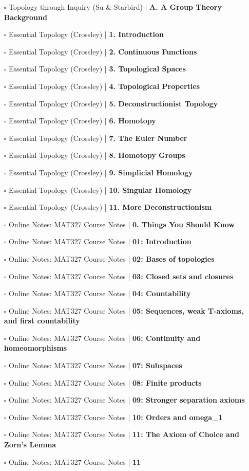 \documentclass[a4, landscape, 12pt]{article}
\newcommand{\checkbox}{$\square$}%
\begin{document}
\begin{itemize}
{}
\item [\checkbox] Topology through Inquiry (Su & Starbird)  | \textbf{A. A Group Theory Background
}
\item [\checkbox] Essential Topology (Crossley)  | \textbf{1. Introduction
}
\item [\checkbox] Essential Topology (Crossley)  | \textbf{2. Continuous Functions
}
\item [\checkbox] Essential Topology (Crossley)  | \textbf{3. Topological Spaces
}
\item [\checkbox] Essential Topology (Crossley)  | \textbf{4. Topological Properties
}
\item [\checkbox] Essential Topology (Crossley)  | \textbf{5. Deconstructionist Topology
}
\item [\checkbox] Essential Topology (Crossley)  | \textbf{6. Homotopy
}
\item [\checkbox] Essential Topology (Crossley)  | \textbf{7. The Euler Number
}
\item [\checkbox] Essential Topology (Crossley)  | \textbf{8. Homotopy Groups
}
\item [\checkbox] Essential Topology (Crossley)  | \textbf{9. Simplicial Homology
}
\item [\checkbox] Essential Topology (Crossley)  | \textbf{10. Singular Homology
}
\item [\checkbox] Essential Topology (Crossley)  | \textbf{11. More Deconstructionism
}
\item [\checkbox] Online Notes: MAT327 Course Notes  | \textbf{0. Things You Should Know
}
\item [\checkbox] Online Notes: MAT327 Course Notes  | \textbf{01: Introduction
}
\item [\checkbox] Online Notes: MAT327 Course Notes  | \textbf{02: Bases of topologies
}
\item [\checkbox] Online Notes: MAT327 Course Notes  | \textbf{03: Closed sets and closures
}
\item [\checkbox] Online Notes: MAT327 Course Notes  | \textbf{04: Countability
}
\item [\checkbox] Online Notes: MAT327 Course Notes  | \textbf{05: Sequences, weak T-axioms, and first countability
}
\item [\checkbox] Online Notes: MAT327 Course Notes  | \textbf{06: Continuity and homeomorphisms
}
\item [\checkbox] Online Notes: MAT327 Course Notes  | \textbf{07: Subspaces
}
\item [\checkbox] Online Notes: MAT327 Course Notes  | \textbf{08: Finite products
}
\item [\checkbox] Online Notes: MAT327 Course Notes  | \textbf{09: Stronger separation axioms
}
\item [\checkbox] Online Notes: MAT327 Course Notes  | \textbf{10: Orders and omega_1
}
\item [\checkbox] Online Notes: MAT327 Course Notes  | \textbf{11: The Axiom of Choice and Zorn's Lemma
}
\item [\checkbox] Online Notes: MAT327 Course Notes  | \textbf{11}


\end{itemize}
\end{document}

